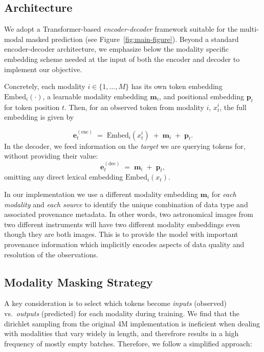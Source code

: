 \documentclass[]{polymathic}
\begin{document}
\subsection{Architecture}

We adopt a Transformer-based \emph{encoder-decoder} framework suitable for the multi-modal masked prediction (see Figure~\ref{fig:main-figure}). Beyond a standard encoder-decoder architecture, we emphasize below the modality specific embedding scheme needed at the input of both the encoder and decoder to implement our objective.

Concretely, each modality \(i\in \{1,\dots,M\}\) has its own token embedding \(\mathrm{Embed}_i(\cdot)\), a learnable modality embedding \(\mathbf{m}_i\), and positional embedding \(\mathbf{p}_t\) for token position \(t\). Then, for an observed token from modality $i$, \(x_t^i\), the full embedding is given by 

\begin{equation}
      \mathbf{e}_t^{(\mathrm{enc})} 
      \;=\; 
      \mathrm{Embed}_i(x_t^i) 
      \;+\; 
      \mathbf{m}_i 
      \;+\;
      \mathbf{p}_t.
\end{equation}
In the decoder, we feed information on the \emph{target} we are querying tokens for, without providing their value:
\begin{equation}
       \mathbf{e}_t^{(\mathrm{dec})} 
       \;=\; 
       \mathbf{m}_i
       \;+\;
       \mathbf{p}_t,
\end{equation}
omitting any direct lexical embedding \(\mathrm{Embed}_i(x_t)\). 

In our implementation we use a different modality embedding \(\mathbf{m}_i\) for \textit{each modality} and \textit{each source} to identify the unique combination of data type and associated provenance metadata. In other words, two astronomical images from two different instruments will have two different modality embeddings even though they are both images. This is to provide the model with important provenance information which implicitly encodes aspects of data quality and resolution of the observations.


\subsection{Modality Masking Strategy}

A key consideration is to select which tokens become \emph{inputs} (observed) vs.\ \emph{outputs} (predicted) for each modality during training. We find that the dirichlet sampling from the original 4M implementation is ineficient when dealing with modalities that vary widely in length, and therefrore results in a high frequency of mostly empty batches. Therefore, we follow a simplified approach:
\end{document}
